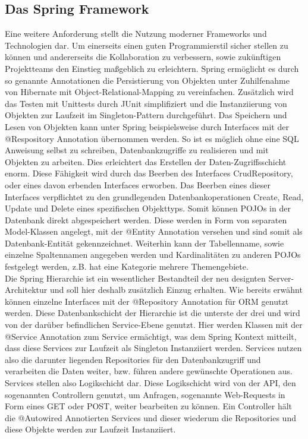 	\subsection{Das Spring Framework}
		Eine weitere Anforderung stellt die Nutzung moderner Frameworks und
		Technologien dar. Um einerseits einen guten Programmierstil sicher stellen zu
		können und andererseits die Kollaboration zu verbessern, sowie zukünftigen
		Projektteams den Einstieg maßgeblich zu erleichtern.
		Spring ermöglicht es durch so genannte Annotationen die Persistierung von
		Objekten unter Zuhilfenahme von Hibernate mit Object-Relational-Mapping zu
		vereinfachen. Zusätzlich wird das Testen mit Unittests durch JUnit
		simplifiziert und die Instanziierung von Objekten zur Laufzeit im
		Singleton-Pattern durchgeführt. Das Speichern und Lesen von Objekten kann
		unter Spring beispielsweise durch Interfaces mit der @Respository Annotation
		übernommen werden. So ist es möglich ohne eine SQL Anweisung selbst zu
		schreiben, Datenbankzugriffe zu realisieren und mit Objekten zu arbeiten.
		Dies erleichtert das Erstellen der Daten-Zugriffsschicht enorm. Diese
		Fähigkeit wird durch das Beerben des Interfaces CrudRepository, oder eines
		davon erbenden Interfaces erworben. Das Beerben eines dieser Interfaces
		verpflichtet zu den grundlegenden Datenbankoperationen Create, Read, Update
		und Delete eines spezifischen Objekttyps. Somit können POJOs in der
		Datenbank direkt abgespeichert werden. Diese werden in Form von separaten
		Model-Klassen angelegt, mit der @Entity Annotation versehen und sind somit
		als Datenbank-Entität gekennzeichnet. Weiterhin kann der Tabellenname, sowie
		einzelne Spaltennamen angegeben werden und Kardinalitäten zu anderen POJOs
		festgelegt werden, z.B. hat eine Kategorie mehrere Themengebiete.\\
		Die Spring Hierarchie ist ein wesentlicher Bestandteil der neu designten
		Server-Architektur und soll hier deshalb zusätzlich Einzug erhalten. Wie
		bereits erwähnt können einzelne Interfaces mit der @Repository Annotation für
		ORM genutzt werden. Diese Datenbankschicht der Hierarchie ist die unterste
		der drei und wird von der darüber befindlichen Service-Ebene genutzt. Hier
		werden Klassen mit der @Service Annotation zum Service ermächtigt, was dem
		Spring Kontext mitteilt, dass diese Services zur Laufzeit als Singleton
		Instanziiert werden. Services nutzen also die darunter liegenden Repositories
		für den Datenbankzugriff und verarbeiten die Daten weiter, bzw. führen andere
		gewünschte Operationen aus. Services stellen also Logikschicht dar. Diese
		Logikschicht wird von der API, den sogenannten Controllern genutzt, um
		Anfragen, sogenannte Web-Requests in Form eines GET oder POST, weiter
		bearbeiten zu können. Ein Controller hält die @Autowired Annotierten Services
		und dieser wiederum die Repositories und diese Objekte werden zur Laufzeit
		Instanziiert.